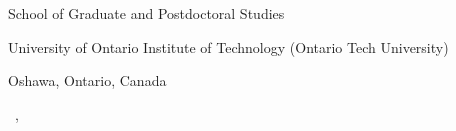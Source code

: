 \begin{titlepage}
\begin{center}
School of Graduate and Postdoctoral Studies 

\medskip

University of Ontario Institute of Technology (Ontario Tech University)

\medskip

Oshawa, Ontario, Canada

\medskip

\degreemonth{} \degreeyear

\vfill


\bigskip
\textcopyright{} \makeatletter \@firstname\ {\@lastname}\makeatother, \degreeyear



\vspace*{2\bigskipamount}

\end{center}

\end{titlepage}
